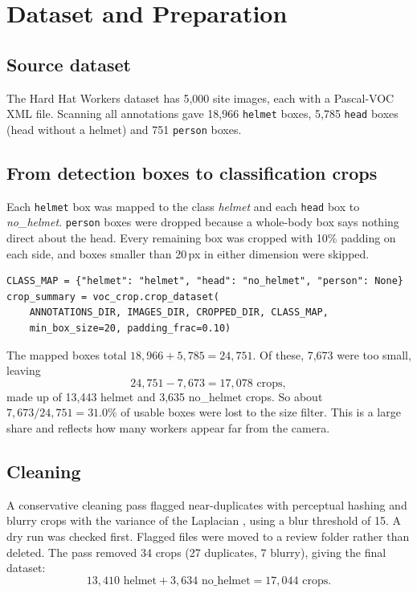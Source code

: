 \documentclass[conference]{IEEEtran}
\begin{document}
\section{Dataset and Preparation}
\subsection{Source dataset}
The Hard Hat Workers dataset \cite{kaggle_hardhat} has 5{,}000 site images, each with a Pascal-VOC XML file. Scanning all annotations gave 18{,}966 \texttt{helmet} boxes, 5{,}785 \texttt{head} boxes (head without a helmet) and 751 \texttt{person} boxes.

\subsection{From detection boxes to classification crops}
Each \texttt{helmet} box was mapped to the class \emph{helmet} and each \texttt{head} box to \emph{no\_helmet}. \texttt{person} boxes were dropped because a whole-body box says nothing direct about the head. Every remaining box was cropped with 10\% padding on each side, and boxes smaller than 20\,px in either dimension were skipped.

\begin{lstlisting}
CLASS_MAP = {"helmet": "helmet", "head": "no_helmet", "person": None}
crop_summary = voc_crop.crop_dataset(
    ANNOTATIONS_DIR, IMAGES_DIR, CROPPED_DIR, CLASS_MAP,
    min_box_size=20, padding_frac=0.10)
\end{lstlisting}

The mapped boxes total $18{,}966 + 5{,}785 = 24{,}751$. Of these, 7{,}673 were too small, leaving
\[
24{,}751 - 7{,}673 = 17{,}078 \text{ crops},
\]
made up of 13{,}443 helmet and 3{,}635 no\_helmet crops.
So about $7{,}673 / 24{,}751 = 31.0\%$ of usable boxes were lost to the size filter. This is a large share and reflects how many workers appear far from the camera.

\subsection{Cleaning}
A conservative cleaning pass flagged near-duplicates with perceptual hashing \cite{zauner2010implementation} and blurry crops with the variance of the Laplacian \cite{pech2000diatom}, using a blur threshold of 15. A dry run was checked first. Flagged files were moved to a review folder rather than deleted. The pass removed 34 crops (27 duplicates, 7 blurry), giving the final dataset:
\[
13{,}410 \text{ helmet} + 3{,}634 \text{ no\_helmet} = 17{,}044 \text{ crops}.
\]
\end{document}
